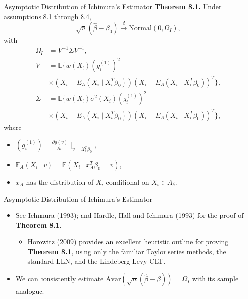 \documentclass[xcolor=svgnames,dvipdfmx,cjk]{beamer}
\theoremstyle{example}
\def\Avar{\text{Avar}}
\def\E{\mathbb{E}}
\def\darrow{\xrightarrow{d}}
\begin{document}
  \begin{frame}{Asymptotic Distribution of Ichimura's Estimator}
  \textbf{Theorem 8.1.} Under assumptions 8.1 through 8.4,
      \[ \sqrt{n}(\hat{\beta} - \beta_0)
        \darrow \text{Normal} (0, \Omega_I),
      \]
  with
    \begin{align*}
      \Omega_I &= V^{-1} \Sigma V^{-1}, \\
      V &= \E\{
        w(X_i) (g_i^{(1)})^2 \\
        & \times (X_i - E_A(X_i\mid X_i^T \beta_0)) (X_i - E_A(X_i\mid X_i^T \beta_0))^T 
      \}, \\
      \Sigma &= \E \{
        w(X_i) \sigma^2(X_i) (g_i^{(1)})^2 \\
        & \times (X_i - E_A(X_i\mid X_i^T \beta_0)) (X_i - E_A(X_i\mid X_i^T \beta_0))^T 
      \},
    \end{align*}
    where
    \begin{itemize}
      \item $(g_i^{(1)}) = \frac{\partial g(v)}{\partial v}\mid_{v= X_i^T \beta_0}$,
      \item $\E_A (X_i\mid v) = \E(X_i \mid x_A^T\beta_0 = v)$,
      \item $x_A$ has the distribution of $X_i$ conditional on $X_i \in A_\delta$.
    \end{itemize}
  \end{frame}
  
  \begin{frame}{Asymptotic Distribution of Ichimura's Estimator}
  \begin{itemize}
    \item See Ichimura (1993); and Hardle, Hall and Ichimura (1993) for the proof of \textbf{Theorem 8.1}.
        \begin{itemize}
          \item Horowitz (2009) provides an excellent heuristic outline for proving \textbf{Theorem 8.1}, 
                using only the familiar Taylor series methods, the standard LLN, and the Lindeberg-Levy CLT.
        \end{itemize}
    \item We can consistently estimate 
          $\Avar\left(\sqrt{n}(\hat{\beta} - \beta)\right) = \Omega_I$ 
          with its sample analogue.
  \end{itemize}
  \end{frame}
  
\end{document}
